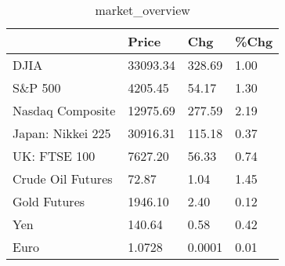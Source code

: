 \documentclass{article}%
\begin{document}
%


\begin{table}[htbp]%
\caption{market\_overview}%
\centering%
\begin{adjustbox}{width=1\textwidth}%
\begin{tabular}{llll}
\toprule
                  &    Price &    Chg & \%Chg \\
\midrule
             DJIA & 33093.34 & 328.69 & 1.00 \\
          S\&P 500 &  4205.45 &  54.17 & 1.30 \\
 Nasdaq Composite & 12975.69 & 277.59 & 2.19 \\
Japan: Nikkei 225 & 30916.31 & 115.18 & 0.37 \\
     UK: FTSE 100 &  7627.20 &  56.33 & 0.74 \\
Crude Oil Futures &    72.87 &   1.04 & 1.45 \\
     Gold Futures &  1946.10 &   2.40 & 0.12 \\
              Yen &   140.64 &   0.58 & 0.42 \\
             Euro &   1.0728 & 0.0001 & 0.01 \\
\bottomrule
\end{tabular}
%
\end{adjustbox}%
\end{table}

%
\end{document}
